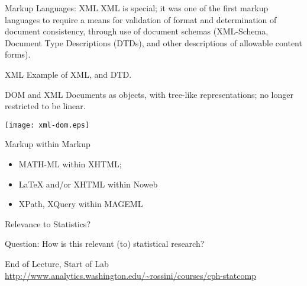 \documentclass[pdf,final,azure]{prosper}
\begin{document}
\begin{slide}{Markup Languages: XML}
  XML is special; it was one of the first markup languages to require
  a means for validation of format and determination of document
  consistency, through use of document schemas (XML-Schema, Document
  Type Descriptions (DTDs), and other descriptions of allowable
  content forms).
\end{slide}


\begin{slide}{XML}
  Example of XML, and DTD.
\end{slide}

\begin{slide}{DOM and XML}
  Documents as objects, with tree-like representations; no longer
  restricted to be linear. \\
\vspace*{4mm} 
\centerline{\texttt{[image: xml-dom.eps]}}

\end{slide}

\begin{slide}{Markup within Markup}
  \begin{itemize}
  \item MATH-ML within XHTML;
  \item \LaTeX{} and/or XHTML within Noweb
  \item XPath, XQuery within MAGEML
  \end{itemize}
\end{slide}




\begin{slide}{Relevance to Statistics? }
  
  Question: How is this relevant (to) statistical research? 

\end{slide}

\begin{slide}{End of Lecture, Start of Lab}
    \vspace*{1cm}
  {\tiny
    \url{http://www.analytics.washington.edu/~rossini/courses/cph-statcomp}
  }
\end{slide}
\end{document}
